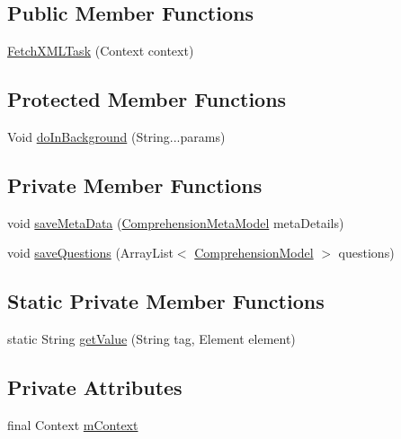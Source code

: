\subsection*{Public Member Functions}
\begin{DoxyCompactItemize}
\item 
\hyperlink{classorg_1_1buildmlearn_1_1comprehension_1_1data_1_1FetchXMLTask_aaf53c1dae9b775788424abcb69eb0847}{Fetch\+X\+M\+L\+Task} (Context context)
\end{DoxyCompactItemize}
\subsection*{Protected Member Functions}
\begin{DoxyCompactItemize}
\item 
Void \hyperlink{classorg_1_1buildmlearn_1_1comprehension_1_1data_1_1FetchXMLTask_a6a140e39f9d6addf55c675e064ae9226}{do\+In\+Background} (String...\+params)
\end{DoxyCompactItemize}
\subsection*{Private Member Functions}
\begin{DoxyCompactItemize}
\item 
void \hyperlink{classorg_1_1buildmlearn_1_1comprehension_1_1data_1_1FetchXMLTask_abab8ea98c4ee54a71a81316d45ac9d8d}{save\+Meta\+Data} (\hyperlink{classorg_1_1buildmlearn_1_1comprehension_1_1data_1_1ComprehensionMetaModel}{Comprehension\+Meta\+Model} meta\+Details)
\item 
void \hyperlink{classorg_1_1buildmlearn_1_1comprehension_1_1data_1_1FetchXMLTask_a7a573e093297412f26fad83c6433e2b1}{save\+Questions} (Array\+List$<$ \hyperlink{classorg_1_1buildmlearn_1_1comprehension_1_1data_1_1ComprehensionModel}{Comprehension\+Model} $>$ questions)
\end{DoxyCompactItemize}
\subsection*{Static Private Member Functions}
\begin{DoxyCompactItemize}
\item 
static String \hyperlink{classorg_1_1buildmlearn_1_1comprehension_1_1data_1_1FetchXMLTask_aaeae221fbcd6be2a5ee5d21c05a7903f}{get\+Value} (String tag, Element element)
\end{DoxyCompactItemize}
\subsection*{Private Attributes}
\begin{DoxyCompactItemize}
\item 
final Context \hyperlink{classorg_1_1buildmlearn_1_1comprehension_1_1data_1_1FetchXMLTask_a174ee55a5116e4f3f57c364712be15c1}{m\+Context}
\end{DoxyCompactItemize}


